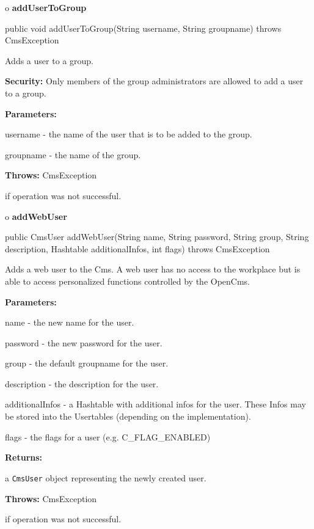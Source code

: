 o {\bf addUserToGroup} 

\begin{PRE}
 public void addUserToGroup(String username,
                            String groupname) throws CmsException
\end{PRE}

\begin{description}
\htmlDD Adds a user to a group. 

{\bf Security:} Only members of the group administrators are allowed to add a
user to a group. 

\begin{description}
\item {\bf Parameters:}  

username - the name of the user that is to be added to the group.  

groupname - the name of the group.  
\item {\bf Throws:} CmsException  

if operation was not successful.  
\end{description}

\end{description}

o {\bf addWebUser} 

\begin{PRE}
 public CmsUser addWebUser(String name,
                           String password,
                           String group,
                           String description,
                           Hashtable additionalInfos,
                           int flags) throws CmsException
\end{PRE}

\begin{description}
\htmlDD Adds a web user to the Cms. \htmlBR
A web user has no access to the workplace but is able to access personalized
functions controlled by the OpenCms. 

\begin{description}
\item {\bf Parameters:}  

name - the new name for the user.  

password - the new password for the user.  

group - the default groupname for the user.  

description - the description for the user.  

additionalInfos - a Hashtable with additional infos for the user. These Infos
may be stored into the Usertables (depending on the implementation).  

flags - the flags for a user (e.g. C\_FLAG\_ENABLED)  
\item {\bf Returns:}  

a {\tt CmsUser} object representing the newly created user.  
\item {\bf Throws:} CmsException  

if operation was not successful.  
\end{description}

\end{description}

